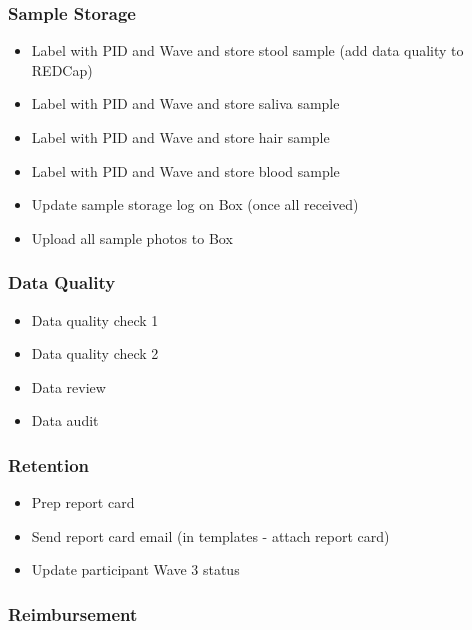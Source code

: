 \documentclass[]{book}
\providecommand{\tightlist}{%
  \setlength{\itemsep}{0pt}\setlength{\parskip}{0pt}}
\begin{document}
\hypertarget{sample-storage-3}{%
\subsubsection{Sample Storage}\label{sample-storage-3}}

\begin{itemize}
\tightlist
\item
  Label with PID and Wave and store stool sample (add data quality to REDCap)
\item
  Label with PID and Wave and store saliva sample
\item
  Label with PID and Wave and store hair sample
\item
  Label with PID and Wave and store blood sample
\item
  Update sample storage log on Box (once all received)
\item
  Upload all sample photos to Box
\end{itemize}

\hypertarget{data-quality-3}{%
\subsubsection{Data Quality}\label{data-quality-3}}

\begin{itemize}
\tightlist
\item
  Data quality check 1
\item
  Data quality check 2
\item
  Data review
\item
  Data audit
\end{itemize}

\hypertarget{retention-2}{%
\subsubsection{Retention}\label{retention-2}}

\begin{itemize}
\tightlist
\item
  Prep report card
\item
  Send report card email (in templates - attach report card)
\item
  Update participant Wave 3 status
\end{itemize}

\hypertarget{reimbursement-2}{%
\subsubsection{Reimbursement}\label{reimbursement-2}}
\end{document}
